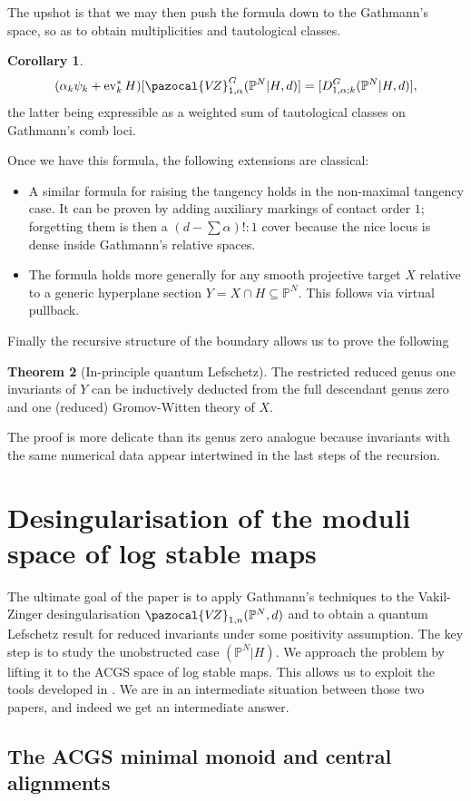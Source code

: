 \documentclass[11pt]{amsart}
\newcommand{\PP}{\mathbb P}
\newcommand{\VZ}{\pazocal{V\!Z}}
\newcommand{\ev}{\operatorname{ev}}
\theoremstyle{definition}
\newtheorem{thm}{Theorem}[section]
\newtheorem{cor}[thm]{Corollary}
\theoremstyle{definition}
\begin{document}
The upshot is that we may then push the formula down to the Gathmann's space, so as to obtain multiplicities and tautological classes.
\begin{cor}
 \[(\alpha_k\psi_k+\ev_k^*H)[\VZ^G_{1,\alpha}(\PP^N|H,d)]=[D^G_{1,\alpha;k}(\PP^N|H,d)],\]
 the latter being expressible as a weighted sum of tautological classes on Gathmann's comb loci.
\end{cor}
Once we have this formula, the following extensions are classical:
\begin{itemize}
 \item A similar formula for raising the tangency holds in the non-maximal tangency case. It can be proven by adding auxiliary markings of contact order $1$; forgetting them is then a $(d-\sum\alpha)!:1$ cover because the nice locus is dense inside Gathmann's relative spaces.
 \item The formula holds more generally for any smooth projective target $X$ relative to a generic hyperplane section $Y=X\cap H\subseteq \PP^N$. This follows via virtual pullback.
\end{itemize}
Finally the recursive structure of the boundary allows us to prove the following
\begin{thm}[In-principle quantum Lefschetz]
 The restricted reduced genus one invariants of $Y$ can be inductively deducted from the full descendant genus zero and one (reduced) Gromov-Witten theory of $X$.
\end{thm}
The proof is more delicate than its genus zero analogue because invariants with the same numerical data appear intertwined in the last steps of the recursion.

\section{Desingularisation of the moduli space of log stable maps}
The ultimate goal of the paper is to apply Gathmann's techniques to the Vakil-Zinger desingularisation $\VZ_{1,n}(\PP^N,d)$ and to obtain a quantum Lefschetz result for reduced invariants under some positivity assumption. The key step is to study the unobstructed case $(\PP^N|H)$. We approach the problem by lifting it to the ACGS space of log stable maps. This allows us to exploit the tools developed in \cite{RSPW,RSPW2}. We are in an intermediate situation between those two papers, and indeed we get an intermediate answer.

\subsection{The ACGS minimal monoid and central alignments}
\end{document}
